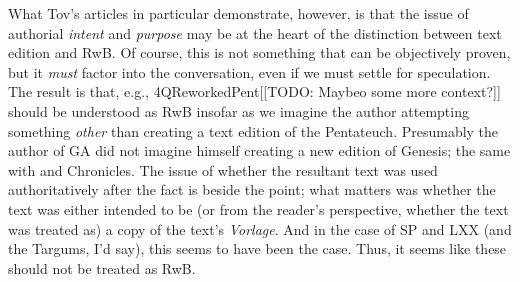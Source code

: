 What Tov's articles in particular demonstrate, however, is that the issue of authorial \emph{intent} and \emph{purpose} may be at the heart of the distinction between text edition and RwB. Of course, this is not something that can be objectively proven, but it \emph{must} factor into the conversation, even if we must settle for speculation. The result is that, e.g., 4QReworkedPent[[TODO: Maybeo some more context?]] should be understood as RwB insofar as we imagine the author attempting something \emph{other} than creating a text edition of the Pentateuch. Presumably the author of GA did not imagine himself creating a new edition of Genesis; the same with \jub and Chronicles. The issue of whether the resultant text was used authoritatively after the fact is beside the point; what matters was whether the text was either intended to be (or from the reader's perspective, whether the text was treated as) a copy of the text's \emph{Vorlage}. And in the case of SP and LXX (and the Targums, I'd say), this seems to have been the case. Thus, it seems like these should not be treated as RwB. 